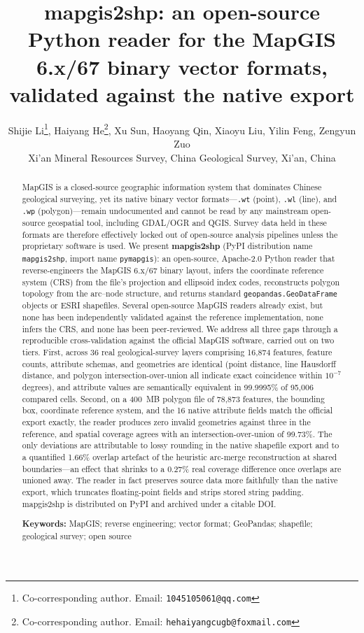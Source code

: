 \documentclass[11pt,a4paper]{article}
\title{mapgis2shp: an open-source Python reader for the MapGIS 6.x/67 binary vector formats, validated against the native export}
\author{%
  Shijie Li\thanks{Co-corresponding author. Email: \texttt{1045105061@qq.com}}, %
  Haiyang He\thanks{Co-corresponding author. Email: \texttt{hehaiyangcugb@foxmail.com}}, %
  Xu Sun, Haoyang Qin, Xiaoyu Liu, Yilin Feng, Zengyun Zuo \\[2pt]
  \small Xi'an Mineral Resources Survey, China Geological Survey, Xi'an, China%
}
\date{}
\begin{document}
\maketitle

\begin{abstract}
\noindent
MapGIS is a closed-source geographic information system that dominates Chinese geological surveying, yet its native binary vector formats---\texttt{.wt} (point), \texttt{.wl} (line), and \texttt{.wp} (polygon)---remain undocumented and cannot be read by any mainstream open-source geospatial tool, including GDAL/OGR and QGIS. Survey data held in these formats are therefore effectively locked out of open-source analysis pipelines unless the proprietary software is used. We present \textbf{mapgis2shp} (PyPI distribution name \texttt{mapgis2shp}, import name \texttt{pymapgis}): an open-source, Apache-2.0 Python reader that reverse-engineers the MapGIS 6.x/67 binary layout, infers the coordinate reference system (CRS) from the file's projection and ellipsoid index codes, reconstructs polygon topology from the arc--node structure, and returns standard \texttt{geopandas.GeoDataFrame} objects or ESRI shapefiles. Several open-source MapGIS readers already exist, but none has been independently validated against the reference implementation, none infers the CRS, and none has been peer-reviewed. We address all three gaps through a reproducible cross-validation against the official MapGIS software, carried out on two tiers. First, across 36 real geological-survey layers comprising 16{,}874 features, feature counts, attribute schemas, and geometries are identical (point distance, line Hausdorff distance, and polygon intersection-over-union all indicate exact coincidence within $10^{-7}$ degrees), and attribute values are semantically equivalent in 99.9995\% of 95{,}006 compared cells. Second, on a 400~MB polygon file of 78{,}873 features, the bounding box, coordinate reference system, and the 16 native attribute fields match the official export exactly, the reader produces zero invalid geometries against three in the reference, and spatial coverage agrees with an intersection-over-union of 99.73\%. The only deviations are attributable to lossy rounding in the native shapefile export and to a quantified 1.66\% overlap artefact of the heuristic arc-merge reconstruction at shared boundaries---an effect that shrinks to a 0.27\% real coverage difference once overlaps are unioned away. The reader in fact preserves source data more faithfully than the native export, which truncates floating-point fields and strips stored string padding. mapgis2shp is distributed on PyPI and archived under a citable DOI.

\medskip
\noindent\textbf{Keywords:} MapGIS; reverse engineering; vector format; GeoPandas; shapefile; geological survey; open source
\end{abstract}
\end{document}
